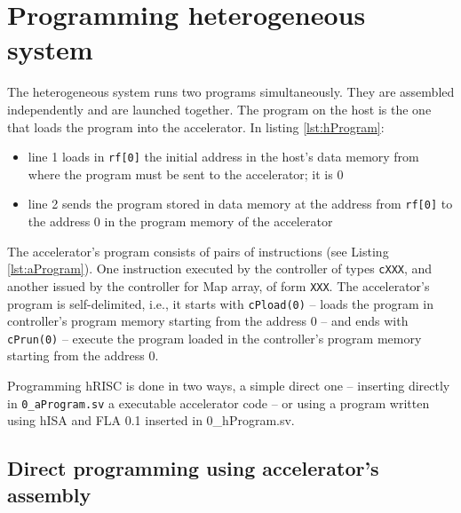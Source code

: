 \section{Programming heterogeneous system}

The heterogeneous system runs two programs simultaneously. They are assembled independently and are launched together. The program on the host is the one that loads the program into the accelerator. In listing \ref{lst:hProgram}:
\begin{itemize}
    \item line 1 loads in {\tt rf[0]} the initial address in the host's data memory from where the program must be sent to the accelerator; it is 0
    \item line 2 sends the program stored in data memory at the address from {\tt rf[0]} to the address 0 in the program memory of the accelerator
\end{itemize}

The accelerator's program consists of pairs of instructions (see Listing \ref{lst:aProgram}). One instruction executed by the controller of types {\tt cXXX}, and another issued by the controller for Map array, of form {\tt XXX}.
The accelerator's program is self-delimited, i.e., it starts with {\tt cPload(0)} -- loads the program in controller's program memory starting from the address 0 -- and ends with {\tt cPrun(0)} -- execute the program loaded in the controller's program memory starting from the address 0.


Programming hRISC is done in two ways, a simple direct one -- inserting directly in {\tt 0\_aProgram.sv} a executable accelerator code -- or using a program written using hISA and FLA 0.1 inserted in 0\_hProgram.sv.

\subsection{Direct programming using accelerator's assembly}

